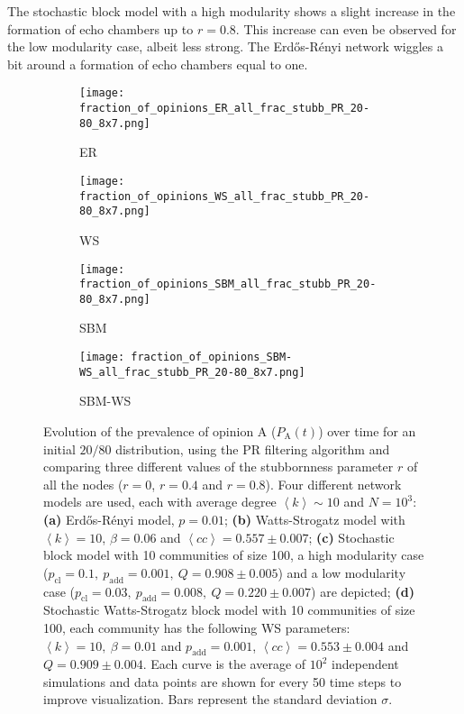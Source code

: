 \documentclass[11 pt , letterpaper , twoside , openright]{book}
\begin{document}
\newline
The stochastic block model with a high modularity shows a slight increase in the formation of echo chambers up to $r = 0.8$. This increase can even be observed for the low modularity case, albeit less strong. The Erd\H{o}s-R\'{e}nyi network wiggles a bit around a formation of echo chambers equal to one.
\newpage
\begin{figure}[H]
  \begin{subfigure}[b]{0.49\textwidth}
    \caption{ER}
  	\texttt{[image: fraction\_of\_opinions\_ER\_all\_frac\_stubb\_PR\_20-80\_8x7.png]}
  \end{subfigure}
  \begin{subfigure}[b]{0.49\textwidth}
    \caption{WS}
  	\texttt{[image: fraction\_of\_opinions\_WS\_all\_frac\_stubb\_PR\_20-80\_8x7.png]}
  \end{subfigure}
  \begin{subfigure}[b]{0.49\textwidth}
    \caption{SBM}
    \texttt{[image: fraction\_of\_opinions\_SBM\_all\_frac\_stubb\_PR\_20-80\_8x7.png]}
  \end{subfigure}
  \begin{subfigure}[b]{0.49\textwidth}
    \caption{SBM-WS}
    \texttt{[image: fraction\_of\_opinions\_SBM-WS\_all\_frac\_stubb\_PR\_20-80\_8x7.png]}
  \end{subfigure}
  \captionsetup{format=plain}
  \caption[Evolution of the prevalence of opinion A ($P_\text{A}(t)$) over time for an initial $20/80$ opinion distribution, using the PR filtering algorithm and comparing three different values of the stubbornness parameter $r$ of all the nodes ($r = 0$, $r = 0.4$ and $r = 0.8$).]{Evolution of the prevalence of opinion A ($P_\text{A}(t)$) over time for an initial $20/80$ distribution, using the PR filtering algorithm and comparing three different values of the stubbornness parameter $r$ of all the nodes ($r = 0$, $r = 0.4$ and $r = 0.8$). Four different network models are used, each with average degree $\left<k\right> \sim 10$ and $N = 10^3$: \textbf{(a)} Erd\H{o}s-R\'{e}nyi model, $p=0.01$; \textbf{(b)} Watts-Strogatz model with $\left<k\right> = 10$, $\beta = 0.06$ and $\left<cc\right> = 0.557 \pm 0.007$; \textbf{(c)} Stochastic block model with 10 communities of size 100, a high modularity case ($p_{\text{cl}} = 0.1,\ p_{\text{add}} = 0.001,\ Q = 0.908 \pm 0.005$) and a low modularity case ($p_{\text{cl}} = 0.03,\ p_{\text{add}} = 0.008,\ Q = 0.220 \pm 0.007$) are depicted; \textbf{(d)} Stochastic Watts-Strogatz block model with 10 communities of size 100, each community has the following WS parameters: $\left<k\right> = 10,\ \beta = 0.01$ and $p_{\text{add}} = 0.001$, $\left<cc\right> = 0.553 \pm 0.004$ and $Q = 0.909 \pm 0.004$. Each curve is the average of $10^2$ independent simulations and data points are shown for every 50 time steps to improve visualization. Bars represent the standard deviation $\sigma$.}%
\label{ev_op_20_80_all_frac_stubb_PR}
\end{figure}
\end{document}
